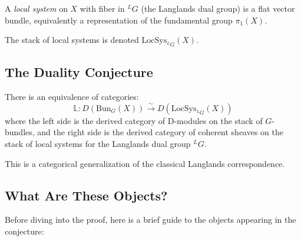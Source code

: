 \begin{definition}
A \emph{local system} on $X$ with fiber in $^LG$ (the Langlands dual group) is a flat vector bundle, equivalently a representation of the fundamental group $\pi_1(X)$.
\end{definition}

The stack of local systems is denoted $\text{LocSys}_{^LG}(X)$.

\subsection{The Duality Conjecture}

\begin{conjecture}
There is an equivalence of categories:
\begin{equation}
\mathbb{L}: D(\text{Bun}_G(X)) \xrightarrow{\sim} D(\text{LocSys}_{^LG}(X))
\end{equation}
where the left side is the derived category of D-modules on the stack of $G$-bundles, and the right side is the derived category of coherent sheaves on the stack of local systems for the Langlands dual group $^LG$.
\end{conjecture}

This is a categorical generalization of the classical Langlands correspondence.

\subsection{What Are These Objects?}
Before diving into the proof, here is a brief guide to the objects appearing in the conjecture:


